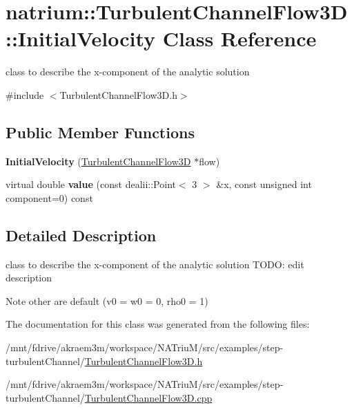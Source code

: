 \hypertarget{classnatrium_1_1TurbulentChannelFlow3D_1_1InitialVelocity}{
\section{natrium::TurbulentChannelFlow3D::InitialVelocity Class Reference}
\label{classnatrium_1_1TurbulentChannelFlow3D_1_1InitialVelocity}
}


class to describe the x-\/component of the analytic solution  


{\ttfamily \#include $<$TurbulentChannelFlow3D.h$>$}\subsection*{Public Member Functions}
\begin{DoxyCompactItemize}
\item 
\hypertarget{classnatrium_1_1TurbulentChannelFlow3D_1_1InitialVelocity_a0cb8fd8fe1bf751968a0aaad6007c63d}{
{\bfseries InitialVelocity} (\hyperlink{classnatrium_1_1TurbulentChannelFlow3D}{TurbulentChannelFlow3D} $\ast$flow)}
\label{classnatrium_1_1TurbulentChannelFlow3D_1_1InitialVelocity_a0cb8fd8fe1bf751968a0aaad6007c63d}

\item 
\hypertarget{classnatrium_1_1TurbulentChannelFlow3D_1_1InitialVelocity_abadf2ae3ab0eb19c48a22c4e9be66c72}{
virtual double {\bfseries value} (const dealii::Point$<$ 3 $>$ \&x, const unsigned int component=0) const }
\label{classnatrium_1_1TurbulentChannelFlow3D_1_1InitialVelocity_abadf2ae3ab0eb19c48a22c4e9be66c72}

\end{DoxyCompactItemize}


\subsection{Detailed Description}
class to describe the x-\/component of the analytic solution TODO: edit description \begin{DoxyNote}{Note}
other are default (v0 = w0 = 0, rho0 = 1) 
\end{DoxyNote}


The documentation for this class was generated from the following files:\begin{DoxyCompactItemize}
\item 
/mnt/fdrive/akraem3m/workspace/NATriuM/src/examples/step-\/turbulentChannel/\hyperlink{TurbulentChannelFlow3D_8h}{TurbulentChannelFlow3D.h}\item 
/mnt/fdrive/akraem3m/workspace/NATriuM/src/examples/step-\/turbulentChannel/\hyperlink{TurbulentChannelFlow3D_8cpp}{TurbulentChannelFlow3D.cpp}\end{DoxyCompactItemize}
